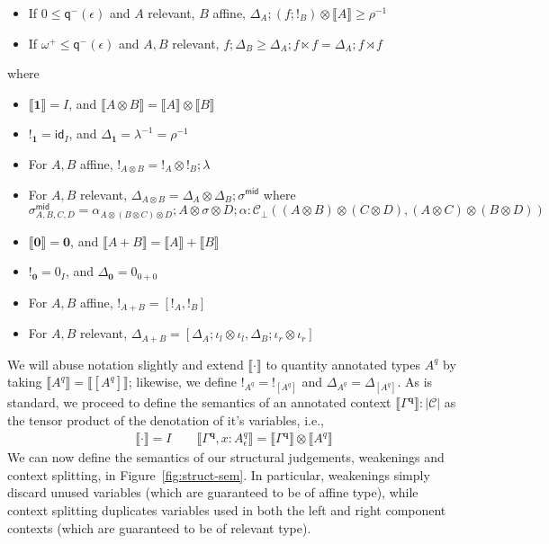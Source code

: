 \documentclass[acmsmall,screen,review]{acmart}
\newcommand{\mc}[1]{\ensuremath{\mathcal{#1}}}
\newcommand{\mb}[1]{\ensuremath{\mathbf{#1}}}
\newcommand{\ms}[1]{\ensuremath{\mathsf{#1}}}
\newcommand{\etoty}[1]{[#1]}
\newcommand{\dnt}[1]{\llbracket{#1}\rrbracket}
\newcommand{\dmor}[1]{{\Delta}_{#1}}
\newcommand{\subiterexp}{\texorpdfstring{\(\lambda_{\ms{iter}}\)}{lambda-iter}}
\newcommand{\zeroq}{0}
\newcommand{\cpyq}{\omega^+}
\newcommand{\alquant}{\ms{q}}
\begin{document}
\begin{definition}[\subiterexp-model]
\begin{itemize}
    \item If $\zeroq \leq \alquant^-(\epsilon)$ and $A$ relevant, $B$ affine, 
      $\dmor{A} ; (f ; !_B) \otimes \dnt{A} \geq \rho^{-1}$
    \item If $\cpyq \leq \alquant^-(\epsilon)$ and $A, B$ relevant, 
    $f ; \dmor{B} \geq \dmor{A} ; f \ltimes f = \dmor{A} ; f \rtimes f$
  \end{itemize}
  where
  \begin{itemize}
    \item $\dnt{\mb{1}} = I$, and $\dnt{A \otimes B} = \dnt{A} \otimes \dnt{B}$
    \item $!_{\mb{1}} = \ms{id}_I$, and $\Delta_{\mb{1}} = \lambda^{-1} = \rho^{-1}$
    \item For $A, B$ affine, $!_{A \otimes B} = !_A \otimes !_B ; \lambda$
    \item For $A, B$ relevant, 
    $\Delta_{A \otimes B} 
      = \dmor{A} \otimes \dmor{B}
      ; \sigma^{\ms{mid}}
    $
    where
    $$
    \sigma^{\ms{mid}}_{A, B, C, D} = 
      \alpha_{A \otimes (B \otimes C) \otimes D}
      ; A \otimes \sigma \otimes D
      ; \alpha
      : \mc{C}_\bot(
        (A \otimes B) \otimes (C \otimes D), 
        (A \otimes C) \otimes (B \otimes D)
      )
    $$
    \item $\dnt{\mb{0}} = \mb{0}$, and $\dnt{A + B} = \dnt{A} + \dnt{B}$
    \item $!_{\mb{0}} = 0_{I}$, and $\Delta_{\mb{0}} = 0_{0 + 0}$
    \item For $A, B$ affine, $!_{A + B} = [!_A, !_B]$
    \item For $A, B$ relevant, 
    $\Delta_{A + B} 
      = [\dmor{A} ; \iota_l \otimes \iota_l, \dmor{B} ; \iota_r \otimes \iota_r]
    $
  \end{itemize}
\end{definition}
We will abuse notation slightly and extend $\dnt{\cdot}$ to quantity 
annotated types $A^q$ by taking $\dnt{A^q} = \dnt{\etoty{A^q}}$; likewise, we define $!_{A^q} =
!_{\etoty{A^q}}$ and $\Delta_{A^q} = \Delta_{\etoty{A^q}}$. As is standard, we proceed to
define the semantics of an annotated context $\dnt{\Gamma^{\mb{q}}} : |\mc{C}|$ as the tensor
product of the denotation of it's variables, i.e.,
\begin{gather*}
  \dnt{\cdot} = I
  \qquad \dnt{\Gamma^{\mb{q}}, x : A^q_\epsilon} 
          = \dnt{\Gamma^{\mb{q}}} \otimes \dnt{A^q}
\end{gather*}
We can now define the semantics of our structural judgements, weakenings and context splitting, in
Figure~\ref{fig:struct-sem}. In particular, weakenings simply discard unused variables (which are
guaranteed to be of affine type), while context splitting duplicates variables used in both the left
and right component contexts (which are guaranteed to be of relevant type).
\end{document}
